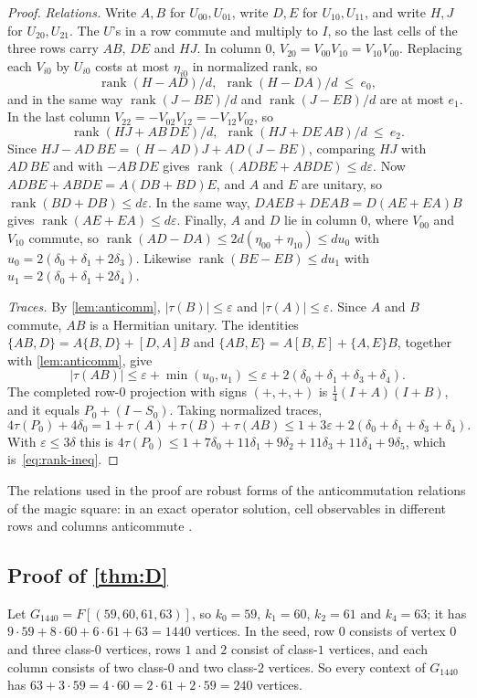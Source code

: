 \documentclass[11pt]{article}
\theoremstyle{definition}
\DeclareMathOperator{\rk}{rank}
\newcommand{\eps}{\varepsilon}
\begin{document}
\begin{proof}
\emph{Relations.}  Write $A,B$ for $U_{00},U_{01}$, write $D,E$ for
$U_{10},U_{11}$, and write $H,J$ for $U_{20},U_{21}$.  The $U$'s in a row
commute and multiply to $I$, so the last cells of the three rows carry $AB$,
$DE$ and $HJ$.  In column $0$, $V_{20}=V_{00}V_{10}=V_{10}V_{00}$.  Replacing
each $V_{i0}$ by $U_{i0}$ costs at most $\eta_{i0}$ in normalized rank, so
\[
 \rk(H-AD)/d,\ \ \rk(H-DA)/d\ \le\ e_0,
\]
and in the same way $\rk(J-BE)/d$ and $\rk(J-EB)/d$ are at most $e_1$.  In
the last column $V_{22}=-V_{02}V_{12}=-V_{12}V_{02}$, so
\[
 \rk(HJ+AB\,DE)/d,\ \ \rk(HJ+DE\,AB)/d\ \le\ e_2 .
\]
Since $HJ-AD\,BE=(H-AD)J+AD(J-BE)$, comparing $HJ$ with $AD\,BE$ and with
$-AB\,DE$ gives $\rk(ADBE+ABDE)\le d\eps$.  Now $ADBE+ABDE=A(DB+BD)E$, and
$A$ and $E$ are unitary, so $\rk(BD+DB)\le d\eps$.  In the same way,
$DAEB+DEAB=D(AE+EA)B$ gives $\rk(AE+EA)\le d\eps$.  Finally, $A$ and $D$ lie
in column $0$, where $V_{00}$ and $V_{10}$ commute, so
$\rk(AD-DA)\le2d(\eta_{00}+\eta_{10})\le du_0$ with
$u_0=2(\delta_0+\delta_1+2\delta_3)$.  Likewise $\rk(BE-EB)\le du_1$ with
$u_1=2(\delta_0+\delta_1+2\delta_4)$.

\emph{Traces.}  By \cref{lem:anticomm}, $\lvert\tau(B)\rvert\le\eps$ and
$\lvert\tau(A)\rvert\le\eps$.  Since $A$ and $B$ commute, $AB$ is a Hermitian
unitary.  The identities $\{AB,D\}=A\{B,D\}+[D,A]B$ and
$\{AB,E\}=A[B,E]+\{A,E\}B$, together with \cref{lem:anticomm}, give
\[
 \lvert\tau(AB)\rvert\le\eps+\min(u_0,u_1)\le\eps+2(\delta_0+\delta_1+\delta_3+\delta_4).
\]
The completed row-$0$ projection with signs $(+,+,+)$ is
$\frac14(I+A)(I+B)$, and it equals $P_0+(I-S_0)$.  Taking normalized traces,
\[
 4\tau(P_0)+4\delta_0=1+\tau(A)+\tau(B)+\tau(AB)
 \le1+3\eps+2(\delta_0+\delta_1+\delta_3+\delta_4).
\]
With $\eps\le3\delta$ this is
$4\tau(P_0)\le1+7\delta_0+11\delta_1+9\delta_2+11\delta_3+11\delta_4+9\delta_5$,
which is~\eqref{eq:rank-ineq}.
\end{proof}

The relations used in the proof are robust forms of the anticommutation
relations of the magic square: in an exact operator solution, cell
observables in different rows and columns anticommute
\cite[Lemma~6]{Ji2013}.

\subsection{Proof of \texorpdfstring{\cref{thm:D}}{Theorem D}}

Let $G_{1440}=F[(59,60,61,63)]$, so $k_0=59$, $k_1=60$, $k_2=61$ and
$k_4=63$; it has $9\cdot59+8\cdot60+6\cdot61+63=1440$ vertices.  In the
seed, row $0$ consists of vertex $0$ and three class-$0$ vertices, rows $1$
and $2$ consist of class-$1$ vertices, and each column consists of two
class-$0$ and two class-$2$ vertices.  So every context of $G_{1440}$ has
$63+3\cdot59=4\cdot60=2\cdot61+2\cdot59=240$ vertices.
\end{document}

